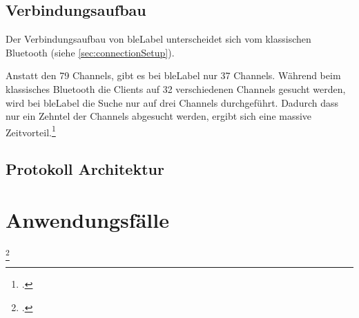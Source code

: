 
\subsection{Verbindungsaufbau}
\label{subsec:bleConnectionSetup}
Der Verbindungsaufbau von \gls{bleLabel} unterscheidet sich vom klassischen Bluetooth (siehe \cref{sec:connectionSetup}).

Anstatt den 79 Channels, gibt es bei \gls{bleLabel} nur 37 Channels. Während beim klassisches Bluetooth die Clients auf 32 verschiedenen Channels gesucht werden, wird bei \gls{bleLabel} die Suche nur auf drei Channels durchgeführt.
Dadurch dass nur ein Zehntel der Channels abgesucht werden, ergibt sich eine massive Zeitvorteil.\footcite{ti_whitepaper_2015-05-08}



\subsection{Protokoll Architektur}

\section{Anwendungsfälle}



\footcite{ti_whitepaper_2015-05-08}



